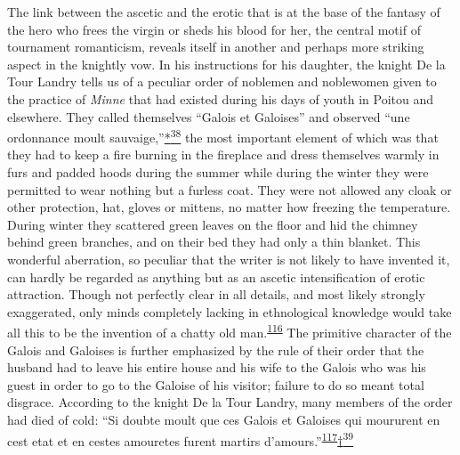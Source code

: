 \protect\hypertarget{10_Chapter_Three__THE_HEROIC_DREAM.xhtmlux5cux23page_98}{}{}The
link between the ascetic and the erotic that is at the base of the
fantasy of the hero who frees the virgin or sheds his blood for her, the
central motif of tournament romanticism, reveals itself in another and
perhaps more striking aspect in the knightly vow. In his instructions
for his daughter, the knight De la Tour Landry tells us of a peculiar
order of noblemen and noblewomen given to the practice of \emph{Minne}
that had existed during his days of youth in Poitou and elsewhere. They
called themselves ``Galois et Galoises'' and observed ``une ordonnance
moult
sauvaige,''\protect\hypertarget{10_Chapter_Three__THE_HEROIC_DREAM.xhtmlux5cux23id_2537}{\protect\hyperlink{23_NOTES.xhtmlux5cux23id_2538}{*\textsuperscript{38}}}
the most important element of which was that they had to keep a fire
burning in the fireplace and dress themselves warmly in furs and padded
hoods during the summer while during the winter they were permitted to
wear nothing but a furless coat. They were not allowed any cloak or
other protection, hat, gloves or mittens, no matter how freezing the
temperature. During winter they scattered green leaves on the floor and
hid the chimney behind green branches, and on their bed they had only a
thin blanket. This wonderful aberration, so peculiar that the writer is
not likely to have invented it, can hardly be regarded as anything but
as an ascetic intensification of erotic attraction. Though not perfectly
clear in all details, and most likely strongly exaggerated, only minds
completely lacking in ethnological knowledge would take all this to be
the invention of a chatty old
man.\textsuperscript{\protect\hypertarget{10_Chapter_Three__THE_HEROIC_DREAM.xhtmlux5cux23id_1703}{\protect\hyperlink{23_NOTES.xhtmlux5cux23id_1704}{116}}}
The primitive character of the Galois and Galoises is further emphasized
by the rule of their order that the husband had to leave his entire
house and his wife to the Galois who was his guest in order to go to the
Galoise of his visitor; failure to do so meant total disgrace. According
to the knight De la Tour Landry, many members of the order had died of
cold: ``Si doubte moult que ces Galois et Galoises qui moururent en cest
etat et en cestes amouretes furent martirs
d'amours.''\textsuperscript{\protect\hypertarget{10_Chapter_Three__THE_HEROIC_DREAM.xhtmlux5cux23id_1701}{\protect\hyperlink{23_NOTES.xhtmlux5cux23id_1702}{117}}}\protect\hypertarget{10_Chapter_Three__THE_HEROIC_DREAM.xhtmlux5cux23id_2539}{\protect\hyperlink{23_NOTES.xhtmlux5cux23id_2540}{†\textsuperscript{39}}}

